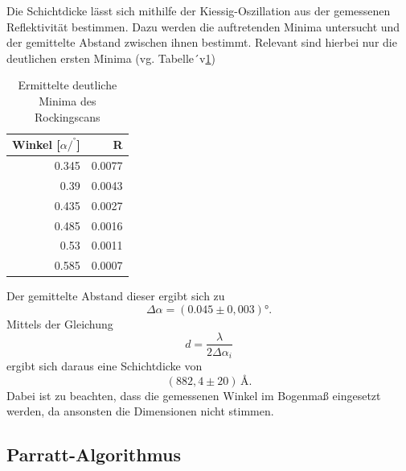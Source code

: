 Die Schichtdicke lässt sich mithilfe der Kiessig-Oszillation aus der gemessenen Reflektivität bestimmen.
Dazu werden die auftretenden Minima untersucht und der gemittelte Abstand zwischen ihnen bestimmt.
Relevant sind hierbei nur die deutlichen ersten Minima (vg. Tabelle´v\ref{tab:scan})
\begin{table}
    \centering
    \caption{Ermittelte deutliche Minima des Rockingscans} 
    \label{tab:scan}
    \begin{tabular}{ r | r}
        \hline			
        Winkel [$\alpha/^°$] & R \\
        \hline
        0.345  & 0.0077  \\
        0.39   & 0.0043  \\
        0.435  & 0.0027  \\
        0.485  & 0.0016  \\
        0.53   & 0.0011  \\
        0.585  & 0.0007  \\
    \hline  
  \end{tabular}
\end{table}

Der gemittelte Abstand dieser ergibt sich zu
\begin{equation}
    \Delta\alpha = (0.045 \pm 0,003)°.
\end{equation}
Mittels der Gleichung
\begin{equation}
    d = \frac{\lambda}{2\Delta\alpha_i}
\end{equation}
ergibt sich daraus eine Schichtdicke von
\begin{equation}
    (882,4 \pm 20) \, \text{\AA}.
\end{equation}
Dabei ist zu beachten, 
dass die gemessenen Winkel im Bogenmaß eingesetzt werden,
da ansonsten die Dimensionen nicht stimmen.

\subsection{Parratt-Algorithmus}

